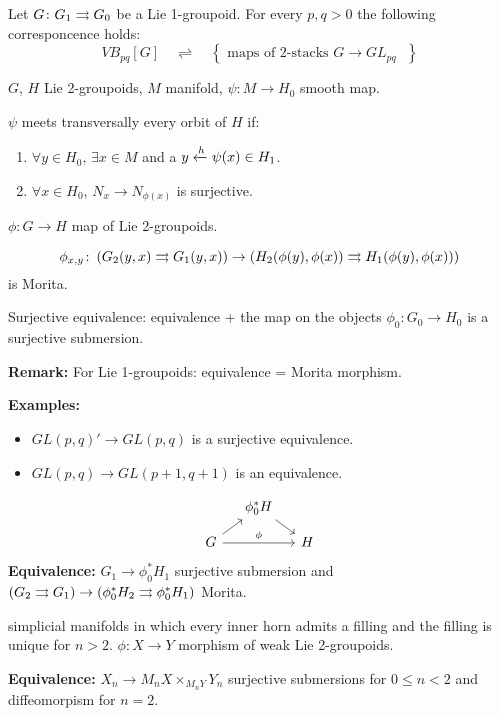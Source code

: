 \begin{thm}
Let $G\colon G_1\rightrightarrows G_0$ be a Lie 1-groupoid.
For every $p,q>0$ the following corresponcence holds:
\[ VB_{pq}[G] \quad \rightleftharpoons \quad \left\{ \text{ maps of 2-stacks $G\to GL_{pq}$ } \right\} \]
\end{thm}

$G$, $H$ Lie 2-groupoids, $M$ manifold, $\psi\colon M\to H_0$  smooth map.

$\psi$ meets transversally every orbit of $H$ if:
\begin{enumerate}
\item $\forall y\in H_0$, $\exists x\in M$ and a $y\xleftarrow{h}\psi(x) \in H_1$.
\item $\forall x\in H_0$, $N_x\to N_{\phi(x)}$ is surjective.
\end{enumerate}

$\phi\colon G\to H$ map of Lie 2-groupoids.

\[ \phi_{x,y}\colon \left( G_2(y,x)\rightrightarrows G_1(y,x) \right) \to \left( H_2(\phi(y),\phi(x))\rightrightarrows H_1(\phi(y),\phi(x)) \right) \]
is Morita.

Surjective equivalence: equivalence + the map on the objects $\phi_0\colon G_0\to H_0$ is a surjective submersion.

\textbf{Remark:} For Lie 1-groupoids: equivalence = Morita morphism.

\textbf{Examples:}
\begin{itemize}
  \item $GL(p,q)' \to GL(p,q)$ is a surjective equivalence.
  \item $GL(p,q) \to GL(p+1,q+1)$ is an equivalence.
\end{itemize}

\[
  \begin{tikzcd}[sep=small]
    & \phi_0^*H \ar{dr} \\
    G \ar{ur} \ar{rr}{\phi} & & H
  \end{tikzcd}
\]
\textbf{Equivalence:} $G_1\to \phi_0^*H_1$ surjective submersion and $(G_2\rightrightarrows G_1)\to (\phi_0^*H_2\rightrightarrows \phi_0^*H_1)$ Morita.

simplicial manifolds in which every inner horn admits a filling and the filling is unique for $n>2$.
$\phi\colon X\to Y$ morphism of weak Lie 2-groupoids.

\textbf{Equivalence:} $X_n \to M_n X \times_{M_n Y} Y_n$ surjective submersions for $0\leq n<2$ and diffeomorpism for $n=2$.

